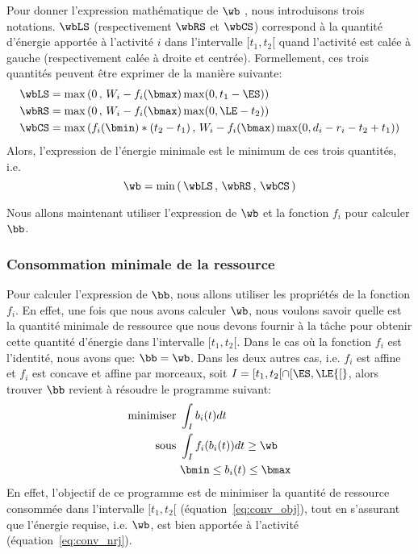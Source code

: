 Pour donner l'expression mathématique de $\wb$ , nous introduisons
trois notations. $\wbLS$ (respectivement $\wbRS$ et $\wbCS$)
correspond à la quantité d'énergie apportée à l'activité $i$ dans
l'intervalle $[t_1,t_2[$ quand l'activité est calée à gauche
(respectivement calée à droite et centrée). Formellement, ces trois
quantités peuvent être exprimer de la manière suivante:
\begin{align}
\wbLS&= \max\left(0\, ,\, W_i- f_i(\bmax)\max(0,t_1 -
\ES)\right) \label{eq:LSnrj_CECSP}\\
\wbRS&= \max\left(0\, ,\, W_i- f_i(\bmax)\max(0,
\LE-t_2)\right)\label{eq:RSnrj_CECSP}\\
\wbCS&=\max\left( f_i(\bmin) * (t_2-t_1)\, ,\, W_i - f_i(\bmax)\max(0,
d_i - r_ i - t_2 + t_1) \right)\label{eq:CSnrj_CECSP}
\end{align}
Alors, l'expression de l'énergie minimale est le minimum de ces trois
quantités, i.e.
\begin{equation}
\wb=\min\left(\, \wbLS\, ,\,\wbRS\, ,\,\wbCS \, \right)
\end{equation} 

Nous allons maintenant utiliser l'expression de $\wb$ et la fonction
$f_i$ pour calculer $\bb$.

\subsubsection{Consommation minimale de la ressource}
	
Pour calculer l'expression de $\bb$, nous allons utiliser les
propriétés de la fonction $f_i$. En effet, une fois que nous avons
calculer $\wb$, nous voulons savoir quelle est la quantité minimale de
ressource que nous devons fournir à la tâche pour obtenir cette
quantité d'énergie dans l'intervalle ${[}t_1,t_2{[}$. Dans le cas où
la fonction $f_i$ est l'identité, nous avons que: $\bb=\wb$. Dans les
deux autres cas, i.e. $f_i$ est affine et $f_i$ est concave et affine
par morceaux, soit $I=[t_1,t_2[ \cap [\ES,\LE{[}$, alors trouver $\bb$
revient à résoudre le programme suivant:
\begin{align}
  \text{minimiser }   & \int_{I} b_i(t)dt \label{eq:conv_obj} \\
  \text{sous } & \int_{I} f_i(b_i(t))dt \ge \wb \label{eq:conv_nrj}\\
                     & \bmin \le b_i(t) \le \bmax \label{eq:conv_min}
\end{align}
En effet, l'objectif de ce programme est de minimiser la quantité de
ressource consommée dans l'intervalle $[t_1,t_2[$
(équation~\eqref{eq:conv_obj}), tout en s'assurant que l'énergie
requise, i.e. $\wb$, est bien apportée à l'activité
(équation~\eqref{eq:conv_nrj}). 

